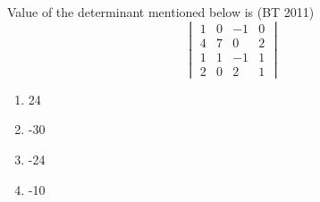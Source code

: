   \item Value of the determinant mentioned below is
\hfill(BT 2011)
  \[
  \begin{vmatrix}
  1 & 0 & -1 & 0 \\
  4 & 7 & 0 & 2 \\
  1 & 1 & -1 & 1 \\
  2 & 0 & 2 & 1
  \end{vmatrix}
  \]
   \begin{multicols}{4}   
    \begin{enumerate}
      \item 24
      \item -30
      \item -24
      \item -10
    \end{enumerate}
    \end{multicols}
    

